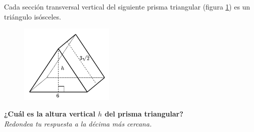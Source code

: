 \question[15]  Cada sección transversal vertical del siguiente prisma triangular (figura \ref{fig:pitagoras3D_pris_03}) es un triángulo isósceles.
\begin{figure}[H]
    \begin{center}
        \includegraphics[width=0.4\textwidth]{../images/pitagoras3D_pris_03.png}
    \end{center}
    \caption{}
    \label{fig:pitagoras3D_pris_03}
\end{figure}
\textbf{¿Cuál es la altura vertical $h$ del prisma triangular?}\\
\textit{Redondea tu respuesta a la décima más cercana.}